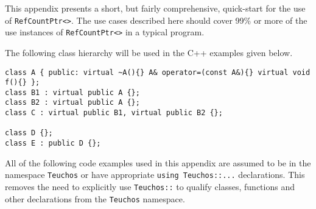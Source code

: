 \documentclass[pdf,ps2pdf,11pt]{SANDreport}
\begin{document}
This appendix presents a short, but fairly comprehensive, quick-start
for the use of {}\texttt{Ref\-Count\-Ptr<>}.  The use cases described
here should cover 99\% or more of the use instances of
{}\texttt{Ref\-Count\-Ptr<>} in a typical program.

The following class hierarchy will be used in the C++ examples given
below.

{\small\begin{verbatim}
class A { public: virtual ~A(){} A& operator=(const A&){} virtual void f(){} };
class B1 : virtual public A {};
class B2 : virtual public A {};
class C : virtual public B1, virtual public B2 {};

class D {};
class E : public D {};
\end{verbatim}}

All of the following code examples used in this appendix are assumed
to be in the namespace {}\texttt{Teuchos} or have appropriate
{}\texttt{using Teuchos::...} declarations.  This removes the need to
explicitly use {}\texttt{Teuchos::} to qualify classes, functions and
other declarations from the {}\texttt{Teuchos} namespace.
\end{document}
